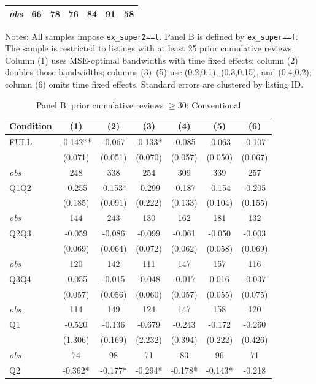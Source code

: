 \begin{table}[!htbp]
\begin{tabular}{lcccccc}
\textit{obs} & 66 & 78 & 76 & 84 & 91 & 58 \\
\bottomrule
\end{tabular}
\begin{minipage}{0.98\textwidth}\footnotesize
Notes: All samples impose \texttt{ex\_super2==t}. Panel B is defined by \texttt{ex\_super==f}. The sample is restricted to listings with at least 25 prior cumulative reviews. Column (1) uses MSE-optimal bandwidths with time fixed effects; column (2) doubles those bandwidths; columns (3)--(5) use (0.2,0.1), (0.3,0.15), and (0.4,0.2); column (6) omits time fixed effects. Standard errors are clustered by listing ID.
\end{minipage}
\end{table}

\begin{table}[!htbp]
\centering
\caption{Panel B, prior cumulative reviews $\geq30$: Conventional}
\begin{tabular}{lcccccc}
\toprule
Condition & (1) & (2) & (3) & (4) & (5) & (6) \\
\midrule
FULL & -0.142** & -0.067 & -0.133* & -0.085 & -0.063 & -0.107 \\
 & (0.071) & (0.051) & (0.070) & (0.057) & (0.050) & (0.067) \\
\textit{obs} & 248 & 338 & 254 & 309 & 339 & 257 \\
Q1Q2 & -0.255 & -0.153* & -0.299 & -0.187 & -0.154 & -0.205 \\
 & (0.185) & (0.091) & (0.222) & (0.133) & (0.104) & (0.155) \\
\textit{obs} & 144 & 243 & 130 & 162 & 181 & 132 \\
Q2Q3 & -0.059 & -0.086 & -0.099 & -0.061 & -0.050 & -0.003 \\
 & (0.069) & (0.064) & (0.072) & (0.062) & (0.058) & (0.069) \\
\textit{obs} & 120 & 142 & 111 & 147 & 157 & 116 \\
Q3Q4 & -0.055 & -0.015 & -0.048 & -0.017 & 0.016 & -0.037 \\
 & (0.057) & (0.056) & (0.060) & (0.057) & (0.055) & (0.075) \\
\textit{obs} & 114 & 149 & 124 & 147 & 158 & 120 \\
Q1 & -0.520 & -0.136 & -0.679 & -0.243 & -0.172 & -0.260 \\
 & (1.306) & (0.169) & (2.232) & (0.394) & (0.222) & (0.426) \\
\textit{obs} & 74 & 98 & 71 & 83 & 96 & 71 \\
Q2 & -0.362* & -0.177* & -0.294* & -0.178* & -0.143* & -0.218 \\

\end{tabular}
\end{table}
